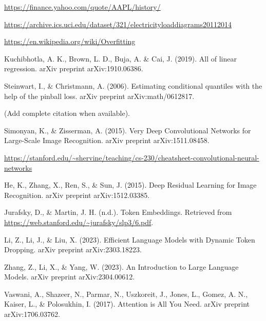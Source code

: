 
\begin{thebibliography}{99}


	 \url{https://finance.yahoo.com/quote/AAPL/history/}

	 \url{https://archive.ics.uci.edu/dataset/321/electricityloaddiagrams20112014}

	 \url{https://en.wikipedia.org/wiki/Overfitting}


	 Kuchibhotla, A. K., Brown, L. D., Buja, A. \& Cai, J. (2019). All of linear regression. arXiv preprint arXiv:1910.06386.

	 Steinwart, I., \& Christmann, A. (2006). Estimating conditional quantiles with the help of the pinball loss. arXiv preprint arXiv:math/0612817.

	 (Add complete citation when available).

	 Simonyan, K., \& Zisserman, A. (2015). Very Deep Convolutional Networks for Large-Scale Image Recognition. arXiv preprint arXiv:1511.08458.

	 \url{https://stanford.edu/~shervine/teaching/cs-230/cheatsheet-convolutional-neural-networks}

	 He, K., Zhang, X., Ren, S., \& Sun, J. (2015). Deep Residual Learning for Image Recognition. arXiv preprint arXiv:1512.03385.

	 Jurafsky, D., \& Martin, J. H. (n.d.). Token Embeddings. Retrieved from \url{https://web.stanford.edu/~jurafsky/slp3/6.pdf}.

	 Li, Z., Li, J., \& Liu, X. (2023). Efficient Language Models with Dynamic Token Dropping. arXiv preprint arXiv:2303.18223.

	 Zhang, Z., Li, X., \& Yang, W. (2023). An Introduction to Large Language Models. arXiv preprint arXiv:2304.00612.

	 Vaswani, A., Shazeer, N., Parmar, N., Uszkoreit, J., Jones, L., Gomez, A. N., Kaiser, L., \& Polosukhin, I. (2017). Attention is All You Need. arXiv preprint arXiv:1706.03762.


\end{thebibliography}
